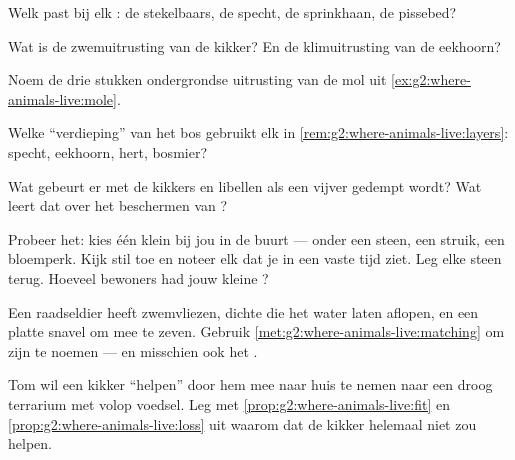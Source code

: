 \begin{exercise}[$\star$]\label{exo:g2:where-animals-live:3}
Welk  past bij elk : de stekelbaars, de specht, de
sprinkhaan, de pissebed?
\end{exercise}

\begin{exercise}[$\star$]\label{exo:g2:where-animals-live:4}
Wat is de zwemuitrusting van de kikker? En de klimuitrusting van de
eekhoorn?
\end{exercise}

\begin{exercise}[$\star$]\label{exo:g2:where-animals-live:5}
Noem de drie stukken ondergrondse uitrusting van de mol uit
\cref{ex:g2:where-animals-live:mole}.
\end{exercise}

\begin{exercise}[$\star$]\label{exo:g2:where-animals-live:6}
Welke ``verdieping'' van het bos gebruikt elk  in
\cref{rem:g2:where-animals-live:layers}: specht, eekhoorn, hert,
bosmier?
\end{exercise}

\begin{exercise}[$\star$]\label{exo:g2:where-animals-live:7}
Wat gebeurt er met de kikkers en libellen als een vijver gedempt wordt?
Wat leert dat over het beschermen van ?
\end{exercise}

\begin{exercise}[$\star$]\label{exo:g2:where-animals-live:8}
Probeer het: kies één klein  bij jou in de buurt --- onder
een steen, een struik, een bloemperk. Kijk stil toe en noteer elk 
dat je in een vaste tijd ziet. Leg elke steen terug. Hoeveel bewoners
had jouw kleine ?
\end{exercise}

\begin{exercise}[$\star\star$]\label{exo:g2:where-animals-live:9}
Een raadseldier heeft zwemvliezen, dichte  die het water laten
aflopen, en een platte snavel om mee te zeven. Gebruik
\cref{met:g2:where-animals-live:matching} om zijn  te noemen
--- en misschien ook het .
\end{exercise}

\begin{exercise}[$\star\star$]\label{exo:g2:where-animals-live:10}
Tom wil een kikker ``helpen'' door hem mee naar huis te nemen naar een
droog terrarium met volop voedsel. Leg met
\cref{prop:g2:where-animals-live:fit} en
\cref{prop:g2:where-animals-live:loss} uit waarom dat de kikker
helemaal niet zou helpen.
\end{exercise}
